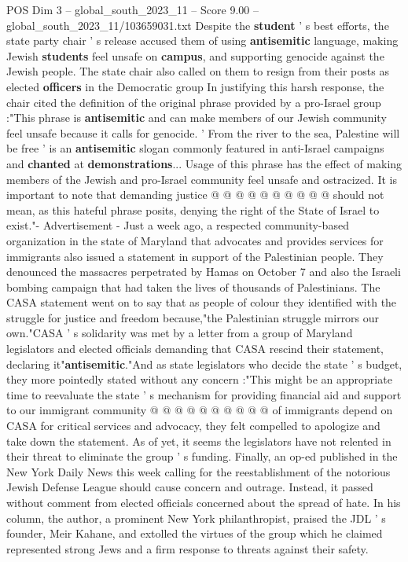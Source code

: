 \begin{textsample}{POS Dim 3 – global\_south\_2023\_11 – Score 9.00 – global\_south\_2023\_11/103659031.txt}
Despite the \textbf{student} ' s best efforts, the state party chair ' s release accused them of using \textbf{antisemitic} language, making Jewish \textbf{students} feel unsafe on \textbf{campus}, and supporting genocide against the Jewish people.
The state chair also called on them to resign from their posts as elected \textbf{officers} in the Democratic group In justifying this harsh response, the chair cited the definition of the original phrase provided by a pro-Israel group :"This phrase is \textbf{antisemitic} and can make members of our Jewish community feel unsafe because it calls for genocide. ' From the river to the sea, Palestine will be free ' is an \textbf{antisemitic} slogan commonly featured in anti-Israel campaigns and \textbf{chanted} at \textbf{demonstrations}...
Usage of this phrase has the effect of making members of the Jewish and pro-Israel community feel unsafe and ostracized.
It is important to note that demanding justice @ @ @ @ @ @ @ @ @ @ should not mean, as this hateful phrase posits, denying the right of the State of Israel to exist."- Advertisement - Just a week ago, a respected community-based organization in the state of Maryland that advocates and provides services for immigrants also issued a statement in support of the Palestinian people.
They denounced the massacres perpetrated by Hamas on October 7 and also the Israeli bombing campaign that had taken the lives of thousands of Palestinians.
The CASA statement went on to say that as people of colour they identified with the struggle for justice and freedom because,"the Palestinian struggle mirrors our own."CASA ' s solidarity was met by a letter from a group of Maryland legislators and elected officials demanding that CASA rescind their statement, declaring it"\textbf{antisemitic}."And as state legislators who decide the state ' s budget, they more pointedly stated without any concern :"This might be an appropriate time to reevaluate the state ' s mechanism for providing financial aid and support to our immigrant community @ @ @ @ @ @ @ @ @ @ of immigrants depend on CASA for critical services and advocacy, they felt compelled to apologize and take down the statement.
As of yet, it seems the legislators have not relented in their threat to eliminate the group ' s funding.
Finally, an op-ed published in the New York Daily News this week calling for the reestablishment of the notorious Jewish Defense League should cause concern and outrage.
Instead, it passed without comment from elected officials concerned about the spread of hate.
In his column, the author, a prominent New York philanthropist, praised the JDL ' s founder, Meir Kahane, and extolled the virtues of the group which he claimed represented strong Jews and a firm response to threats against their safety.

\end{textsample}
